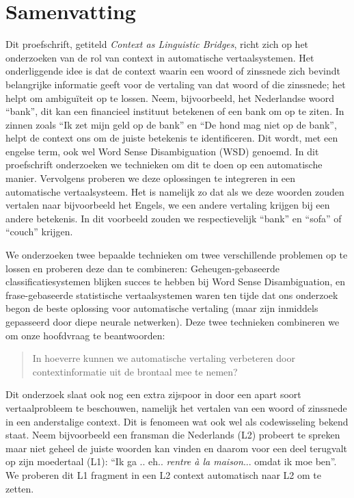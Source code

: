 \chapter*{Samenvatting}

Dit proefschrift, getiteld \emph{Context as Linguistic Bridges}, richt zich op het onderzoeken van de rol van
context in automatische vertaalsystemen. Het onderliggende idee is dat de context waarin een woord of zinssnede zich
bevindt belangrijke informatie geeft voor de vertaling van dat woord of die zinssnede; het helpt om ambiguïteit op te
lossen.
Neem, bijvoorbeeld, het Nederlandse woord ``bank'', dit kan een financieel instituut betekenen of een bank om op te
ziten. In zinnen zoals ``Ik zet mijn geld op de bank'' en ``De hond mag niet op de bank'', helpt de context ons om de
juiste betekenis te identificeren. Dit wordt, met een engelse term, ook wel Word Sense Disambiguation (WSD) genoemd. In
dit proefschrift onderzoeken we technieken om dit te doen op een automatische manier. Vervolgens proberen we deze
oplossingen te integreren in een automatische vertaalsysteem. Het is namelijk zo dat als we deze woorden zouden vertalen
naar bijvoorbeeld het Engels, we een andere vertaling krijgen bij een andere betekenis. In dit voorbeeld zouden we
respectievelijk ``bank'' en ``sofa'' of ``couch'' krijgen.

We onderzoeken twee bepaalde technieken om twee verschillende problemen op te lossen en proberen deze dan te
combineren: Geheugen-gebaseerde classificatiesystemen blijken succes te hebben bij Word Sense Disambiguation, en
frase-gebaseerde statistische vertaalsystemen waren ten tijde dat ons onderzoek begon de beste oplossing voor
automatische vertaling (maar zijn inmiddels gepasseerd door diepe neurale netwerken). Deze twee technieken combineren we
om onze hoofdvraag te beantwoorden:

\begin{quote}
In hoeverre kunnen we automatische vertaling verbeteren door contextinformatie uit de brontaal mee te nemen?
\end{quote}

Dit onderzoek slaat ook nog een extra zijspoor in door een apart soort vertaalprobleem te beschouwen, namelijk het vertalen
van een woord of zinssnede in een anderstalige context. Dit is fenomeen wat ook wel als codewisseling bekend staat. Neem
bijvoorbeeld een fransman die Nederlands (L2) probeert te spreken maar niet geheel de juiste woorden kan vinden en
daarom voor een deel terugvalt op zijn moedertaal (L1): ``Ik ga .. eh.. \emph{rentre à la maison}... omdat ik moe ben''.
We proberen dit L1 fragment in een L2 context automatisch naar L2 om te zetten.

